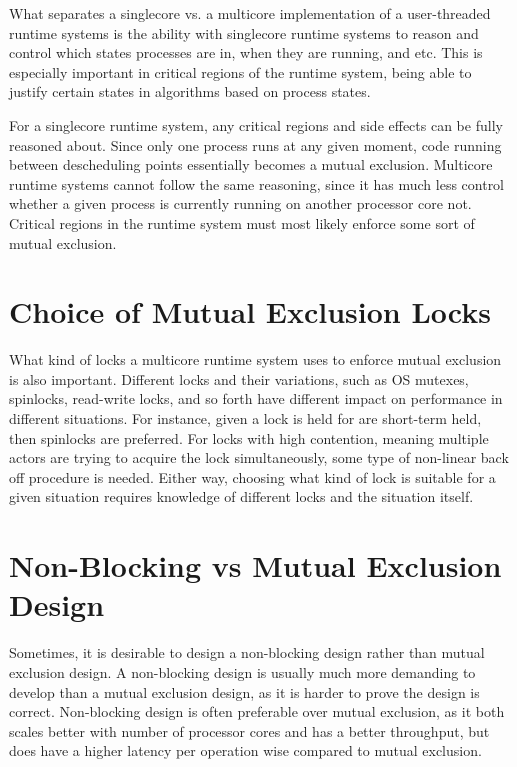 What separates a singlecore vs. a multicore implementation of a user\hyp{}threaded runtime systems is the ability with singlecore runtime systems to reason and control which states processes are in, when they are running, and etc. This is especially important in critical regions of the runtime system, being able to justify certain states in algorithms based on process states.

For a singlecore runtime system, any critical regions and side effects can be fully reasoned about. Since only one process runs at any given moment, code running between descheduling points essentially becomes a mutual exclusion. Multicore runtime systems cannot follow the same reasoning, since it has much less control whether a given process is currently running on another processor core not. Critical regions in the runtime system must most likely enforce some sort of mutual exclusion. 


\section{Choice of Mutual Exclusion Locks}


What kind of locks a multicore runtime system uses to enforce mutual exclusion is also important. Different locks and their variations, such as OS mutexes, spinlocks, read\hyp{}write locks, and so forth have different impact on performance in different situations. For instance, given a lock is held for are short\hyp{}term held, then spinlocks are preferred. For locks with high contention, meaning multiple actors are trying to acquire the lock simultaneously, some type of non\hyp{}linear back off procedure is needed. Either way, choosing what kind of lock is suitable for a given situation requires knowledge of different locks and the situation itself.


\section{Non\hyp{}Blocking vs Mutual Exclusion Design}


Sometimes, it is desirable to design a non\hyp{}blocking design rather than mutual exclusion design. A non\hyp{}blocking design is usually much more demanding to develop than a mutual exclusion design, as it is harder to prove the design is correct. Non\hyp{}blocking design is often preferable over mutual exclusion, as it both scales better with number of processor cores and has a better throughput, but does have a higher latency per operation wise compared to mutual exclusion.


